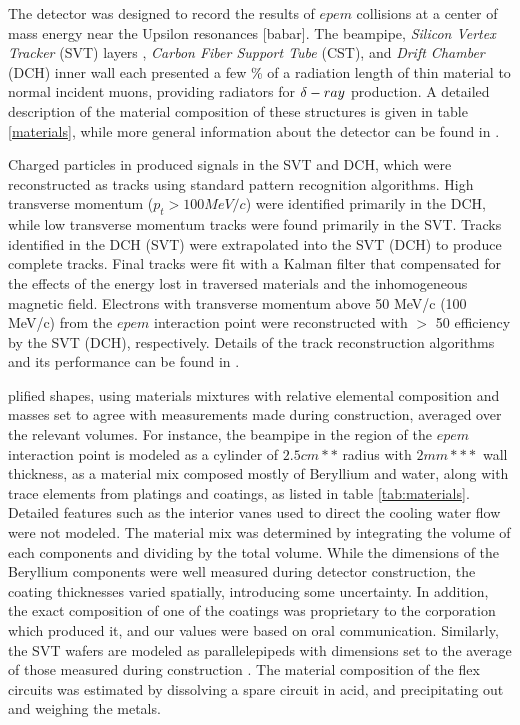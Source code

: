 \documentclass[review]{elsarticle}
\def\deltaray{\ensuremath{{\rm \delta}-ray}\xspace}
\begin{document}
The \babar detector was designed to record the results of $epem$ collisions at
a center of mass energy near the Upsilon resonances [babar].  The \babar
beampipe, {\em Silicon Vertex Tracker} (SVT) layers , {\em Carbon Fiber Support Tube}
(CST), and  {\em Drift Chamber} (DCH) inner wall each presented a few  \% of a
radiation length of thin material to normal incident muons, providing radiators
for \deltaray production.  A detailed description of the material composition
of these structures is given in table \ref{materials}, while more general
information about the \babar detector can be found in \cite{babarnim}.

Charged particles in \babar produced signals in the SVT and DCH, which were
reconstructed as tracks using standard pattern recognition algorithms.  High
transverse momentum ($p_t > 100 MeV/c$) were identified primarily in the DCH,
while low transverse momentum tracks were found primarily in the SVT.  Tracks
identified in the DCH (SVT) were extrapolated into the SVT (DCH) to produce
complete tracks.  Final tracks were fit with a Kalman filter that compensated
for the effects of the energy lost in traversed materials and the inhomogeneous
\babar magnetic field.  Electrons with transverse momentum above 50 MeV/c (100
MeV/c) from the $epem$ interaction point were reconstructed with $>$ 50%
efficiency by the SVT (DCH), respectively.  Details of the \babar track
reconstruction algorithms and its performance can be found in \cite{babarnim2}.

plified shapes, using materials mixtures with relative elemental composition
and masses set to agree with measurements made during construction, averaged
over the relevant volumes.  For instance, the beampipe in the region of the
$epem$ interaction point is modeled as a cylinder of $2.5cm**$ radius with $2mm***$
wall thickness, as a material mix composed mostly of Beryllium and water, along
with trace elements from platings and coatings, as listed in table
\ref{tab:materials}.  Detailed features such as the interior vanes used to
direct the cooling water flow were not modeled.  The material mix was
determined by integrating the volume of each components and dividing by the
total volume.  While the dimensions of the Beryllium components were well
measured during detector construction, the coating thicknesses varied
spatially, introducing some uncertainty.  In addition, the exact composition of
one of the coatings \cite{paint} was proprietary to the corporation which
produced it, and our values were based on oral communication.  Similarly, the
SVT wafers are modeled as parallelepipeds with dimensions set to the average of
those measured during construction \cite{babarnim}.  The material composition of
the flex circuits was estimated by dissolving a spare circuit in acid, and
precipitating out and weighing the metals.
\end{document}
